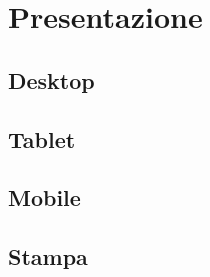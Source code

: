 \section{Presentazione}
\label{presentazione}

\subsection{Desktop}
\label{presentazione-desktop}

\subsection{Tablet}
\label{presentazione-tablet}

\subsection{Mobile}
\label{presentazione-mobile}

\subsection{Stampa}
\label{presentazione-stampa}
